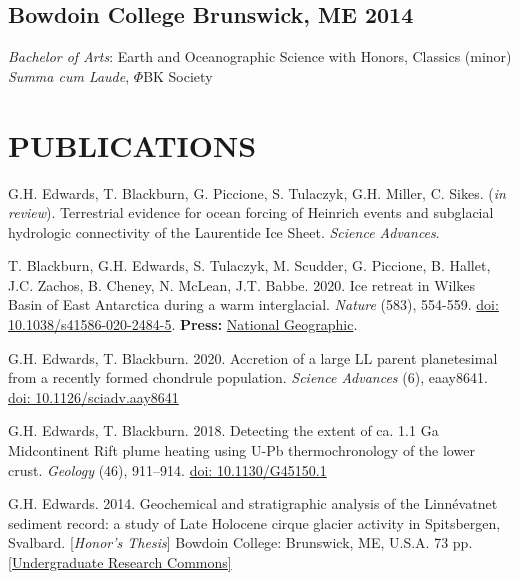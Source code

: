 \documentclass[10pt]{article}
\begin{document}
\subsection*{\textbf{Bowdoin College} \hspace{15pt} Brunswick, ME \hfill 2014}
\textit{Bachelor of Arts}: Earth and Oceanographic Science with Honors, Classics (minor) \\
\textit{Summa cum Laude}, $\Phi$BK Society


\section*{PUBLICATIONS}

\begin{etaremune} [itemsep=4pt, leftmargin=3ex]
\item G.H. Edwards, T. Blackburn, G. Piccione, S. Tulaczyk, G.H. Miller, C. Sikes. (\textit{in review}). Terrestrial evidence for ocean forcing of Heinrich events and subglacial hydrologic connectivity of the Laurentide Ice Sheet. \textit{Science Advances}.
\item T. Blackburn, G.H. Edwards, S. Tulaczyk, M. Scudder, G. Piccione, B. Hallet, J.C. Zachos, B. Cheney, N. McLean, J.T. Babbe. 2020. Ice retreat in Wilkes Basin of East Antarctica during a warm interglacial. \textit{Nature} (583), 554-559. \href{https://doi.org/10.1038/s41586-020-2484-5}{doi: 10.1038/s41586-020-2484-5}. \textbf{Press:} \href{https://www.nationalgeographic.com/science/2020/07/east-antarctic-ice-sheet-more-vulnerable-to-melting-than-thought/}{National Geographic}.
\item G.H. Edwards, T. Blackburn. 2020. Accretion of a large LL parent planetesimal from a recently formed chondrule population. \textit{Science Advances} (6), eaay8641. \href{https://advances.sciencemag.org/content/6/16/eaay8641}{doi: 10.1126/sciadv.aay8641}
\item G.H. Edwards, T. Blackburn. 2018. Detecting the extent of ca. 1.1 Ga Midcontinent Rift plume heating using U-Pb thermochronology of the lower crust. \textit{Geology} (46), 911–914. \href{https://doi.org/10.1130/G45150.1}{doi: 10.1130/G45150.1} \item G.H. Edwards. 2014. Geochemical and stratigraphic analysis of the Linnévatnet sediment record: a study of Late Holocene cirque glacier activity in Spitsbergen, Svalbard. [\textit{Honor’s Thesis}] Bowdoin College: Brunswick, ME, U.S.A. 73 pp. \href{https://digitalcommons.bowdoin.edu/honorsprojects/12/}{[Undergraduate Research Commons]}
\end{etaremune}
\end{document}
